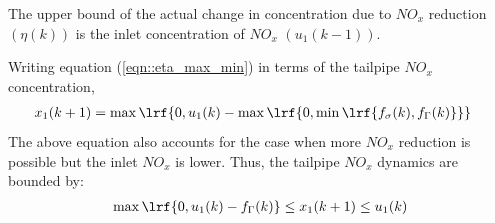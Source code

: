 The upper bound of the actual change in concentration due to $NO_x$ reduction $(\eta(k))$ is the inlet concentration of $NO_x$ $(u_1(k-1))$.

Writing equation (\ref{eqn::eta_max_min}) in terms of the tailpipe $NO_x$ concentration,
\begin{align}
        x_1(k+1) &= \max \lrf{0, u_1(k) - \max \lrf{ 0, \min \lrf{f_{\sigma}(k), f_{\Gamma}(k)}}}
\end{align}
The above equation also accounts for the case when more $NO_x$ reduction is possible but the inlet $NO_x$ is lower.
Thus, the tailpipe $NO_x$ dynamics are bounded by:
\begin{align}
        \max \lrf{0, u_1(k) - f_{\Gamma}(k)} \leq x_1(k+1) \leq u_1(k)
\end{align}


% 
